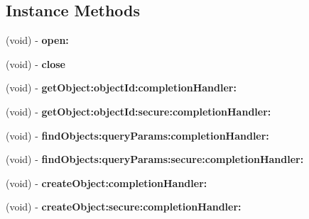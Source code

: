 \subsection*{Instance Methods}
\begin{DoxyCompactItemize}
\item 
(void) -\/ {\bfseries open\+:}\hypertarget{protocol_s_c_service_manager_protocol-p_a5a08c6e6bbd4b27828d1e28d5a7debc8}{}\label{protocol_s_c_service_manager_protocol-p_a5a08c6e6bbd4b27828d1e28d5a7debc8}

\item 
(void) -\/ {\bfseries close}\hypertarget{protocol_s_c_service_manager_protocol-p_af200353f4e25ea8bf2758a3f15cfbc28}{}\label{protocol_s_c_service_manager_protocol-p_af200353f4e25ea8bf2758a3f15cfbc28}

\item 
(void) -\/ {\bfseries get\+Object\+:object\+Id\+:completion\+Handler\+:}\hypertarget{protocol_s_c_service_manager_protocol-p_aa1818b2b0ed3b1afeb80302dea5609cb}{}\label{protocol_s_c_service_manager_protocol-p_aa1818b2b0ed3b1afeb80302dea5609cb}

\item 
(void) -\/ {\bfseries get\+Object\+:object\+Id\+:secure\+:completion\+Handler\+:}\hypertarget{protocol_s_c_service_manager_protocol-p_a84cf66aabd3c0a5be6d6f5e5dbd29e46}{}\label{protocol_s_c_service_manager_protocol-p_a84cf66aabd3c0a5be6d6f5e5dbd29e46}

\item 
(void) -\/ {\bfseries find\+Objects\+:query\+Params\+:completion\+Handler\+:}\hypertarget{protocol_s_c_service_manager_protocol-p_a401bd37460793f970265c9cca70f85bc}{}\label{protocol_s_c_service_manager_protocol-p_a401bd37460793f970265c9cca70f85bc}

\item 
(void) -\/ {\bfseries find\+Objects\+:query\+Params\+:secure\+:completion\+Handler\+:}\hypertarget{protocol_s_c_service_manager_protocol-p_a29d1e7198e775429711679988affa4c0}{}\label{protocol_s_c_service_manager_protocol-p_a29d1e7198e775429711679988affa4c0}

\item 
(void) -\/ {\bfseries create\+Object\+:completion\+Handler\+:}\hypertarget{protocol_s_c_service_manager_protocol-p_ab5a8311a93b7d15d164943d1356a60c2}{}\label{protocol_s_c_service_manager_protocol-p_ab5a8311a93b7d15d164943d1356a60c2}

\item 
(void) -\/ {\bfseries create\+Object\+:secure\+:completion\+Handler\+:}\hypertarget{protocol_s_c_service_manager_protocol-p_ae0b4b8927d25b7aeb498fe08efa59826}{}\label{protocol_s_c_service_manager_protocol-p_ae0b4b8927d25b7aeb498fe08efa59826}


\end{DoxyCompactItemize}
